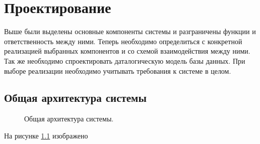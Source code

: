 \newpage
\chapter{Проектирование}
Выше были выделены основные компоненты системы и разграничены функции и
ответственность между ними. Теперь необходимо определиться с конкретной
реализацией выбранных компонентов и со схемой взаимодействия между ними. Так же
необходимо спроектировать даталогическую модель базы данных. При выборе
реализации необходимо учитывать требования к системе в целом.

\section{Общая архитектура системы }
\begin{figure}[h]
\caption{Общая архитектура системы.}
\label{ris:general_architecture}
\end{figure}

На рисунке \ref{ris:general_architecture} изображено